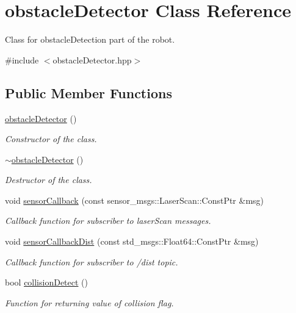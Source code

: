 \hypertarget{classobstacleDetector}{}\section{obstacle\+Detector Class Reference}
\label{classobstacleDetector}


Class for obstacle\+Detection part of the robot.  




{\ttfamily \#include $<$obstacle\+Detector.\+hpp$>$}

\subsection*{Public Member Functions}
\begin{DoxyCompactItemize}
\item 
\hyperlink{classobstacleDetector_a097bd0bdd72d1bc17d167a902f0e85c7}{obstacle\+Detector} ()\hypertarget{classobstacleDetector_a097bd0bdd72d1bc17d167a902f0e85c7}{}\label{classobstacleDetector_a097bd0bdd72d1bc17d167a902f0e85c7}

\begin{DoxyCompactList}\small\item\em Constructor of the class. \end{DoxyCompactList}\item 
\hyperlink{classobstacleDetector_af3e934355f1046a3f235cf680817a590}{$\sim$obstacle\+Detector} ()\hypertarget{classobstacleDetector_af3e934355f1046a3f235cf680817a590}{}\label{classobstacleDetector_af3e934355f1046a3f235cf680817a590}

\begin{DoxyCompactList}\small\item\em Destructor of the class. \end{DoxyCompactList}\item 
void \hyperlink{classobstacleDetector_ae12f2ef16507c879349cbaafbe4254e1}{sensor\+Callback} (const sensor\+\_\+msgs\+::\+Laser\+Scan\+::\+Const\+Ptr \&msg)
\begin{DoxyCompactList}\small\item\em Callback function for subscriber to laser\+Scan messages. \end{DoxyCompactList}\item 
void \hyperlink{classobstacleDetector_a3adcedcf00c41fc0ba6e8d97e322f0ee}{sensor\+Callback\+Dist} (const std\+\_\+msgs\+::\+Float64\+::\+Const\+Ptr \&msg)
\begin{DoxyCompactList}\small\item\em Callback function for subscriber to /dist topic. \end{DoxyCompactList}\item 
bool \hyperlink{classobstacleDetector_a90c1101b6e3b4f26251d67793d41bd9c}{collision\+Detect} ()
\begin{DoxyCompactList}\small\item\em Function for returning value of collision flag. \end{DoxyCompactList}\end{DoxyCompactItemize}


